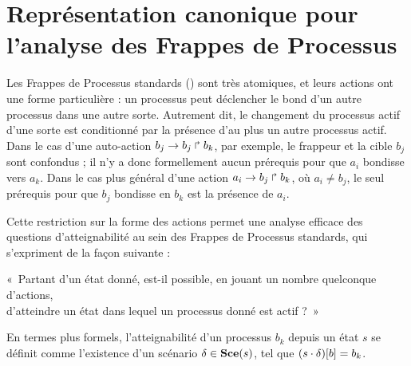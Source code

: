 
\chapter{Représentation canonique pour l'analyse des Frappes de Processus}




Les Frappes de Processus standards () sont très atomiques,
et leurs actions ont une forme particulière :
un processus peut déclencher le bond d'un autre processus dans une autre sorte.
Autrement dit, le changement du processus actif d'une sorte est conditionné par la présence
d'au plus un autre processus actif.
Dans le cas d'une auto-action $b_j\rightarrow b_j\Rsh b_k$, par exemple,
le frappeur et la cible $b_j$ sont confondus ;
il n'y a donc formellement aucun prérequis pour que $a_i$ bondisse vers $a_k$.
Dans le cas plus général d'une action $a_i\rightarrow b_j\Rsh b_k$, où $a_i \neq b_j$,
le seul prérequis pour que $b_j$ bondisse en $b_k$ est la présence de $a_i$.

Cette restriction sur la forme des actions permet une analyse efficace des questions d'atteignabilité
au sein des Frappes de Processus standards, qui s'expriment de la façon suivante :
\begin{center}
  «~Partant d'un état donné, est-il possible, en jouant un nombre quelconque d'actions,\\
  d'atteindre un état dans lequel un processus donné est actif ?~»
\end{center}
En termes plus formels, l'atteignabilité d'un processus $b_k$ depuis un état $s$
se définit comme l'existence d'un scénario $\delta \in \mathbf{Sce}(s)$, tel que
${(s \cdot \delta)[b]} = b_k$.

